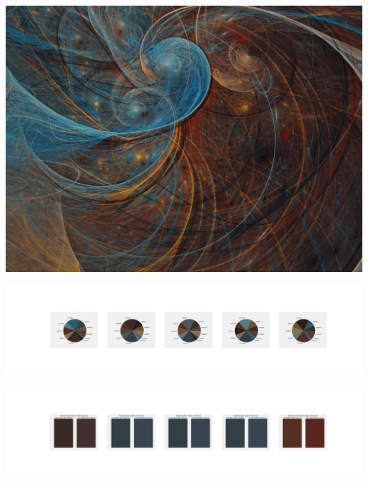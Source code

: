 \documentclass[11pt]{article}
\begin{document}
\begin{landscape}
    \begin{center}
    \includegraphics[width=\textwidth]{./nbimg/file (211).jpg}
    \end{center}

    \begin{center}
    \includegraphics[width=250mm]{./nbimg/pie-125.jpg}
    \end{center}

    \begin{center}
    \includegraphics[width=250mm]{./nbimg/peak-125.jpg}
    \end{center}
    


\end{landscape}
\end{document}

